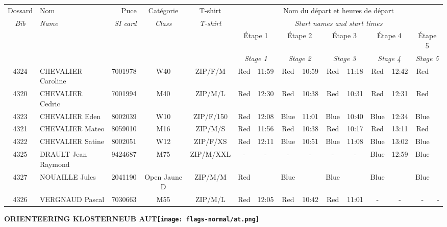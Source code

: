 \documentclass{report}
\begin{document}
  \begin{longtable}{|c|l|r|c|c|*{5}{cc|}}
    Dossard & Nom  & Puce    & Catégorie & T-shirt & \multicolumn{10}{c|}{Nom du départ et heures de départ} \\
    \itshape Bib     & \itshape Name & \itshape SI card & \itshape Class  & \itshape  T-shirt  & \multicolumn{10}{c|}{\itshape Start names and start times} \\
    \hline
    & & & & & \multicolumn{2}{c|}{Étape 1} & \multicolumn{2}{c|}{Étape 2} & \multicolumn{2}{c|}{Étape 3} & \multicolumn{2}{c|}{Étape 4} & \multicolumn{2}{c|}{Étape 5} \\
    & & & & & \multicolumn{2}{c|}{\itshape Stage 1} & \multicolumn{2}{c|}{\itshape Stage 2} & \multicolumn{2}{c|}{\itshape Stage 3} & \multicolumn{2}{c|}{\itshape Stage 4} & \multicolumn{2}{c|}{\itshape Stage 5} \\
    \hline
    4324 & CHEVALIER Caroline & 7001978 & W40 & ZIP/F/M & Red & 11:59 & Red & 10:59 & Red & 11:18 & Red & 12:42 & Red &  \\
    4320 & CHEVALIER Cedric & 7001994 & M40 & ZIP/M/L & Red & 12:30 & Red & 10:38 & Red & 10:31 & Red & 12:31 & Red &  \\
    4323 & CHEVALIER Eden & 8002039 & W10 & ZIP/F/150 & Red & 12:08 & Blue & 11:01 & Blue & 10:40 & Blue & 12:34 & Blue &  \\
    4321 & CHEVALIER Mateo & 8059010 & M16 & ZIP/M/S & Red & 11:56 & Red & 10:38 & Red & 10:17 & Red & 13:11 & Red &  \\
    4322 & CHEVALIER Satine & 8002051 & W12 & ZIP/F/XS & Red & 12:11 & Blue & 10:51 & Blue & 11:08 & Blue & 13:02 & Blue &  \\
    4325 & DRAULT Jean Raymond & 9424687 & M75 & ZIP/M/XXL & - &  - & - &  - & - &  - & Blue & 12:59 & Blue &  \\
    4327 & NOUAILLE Jules & 2041190 & Open Jaune D & ZIP/M/M & Red &   & Blue &   & Blue &   & Blue &   & Blue &  \\
    4326 & VERGNAUD Pascal & 7030663 & M55 & ZIP/M/L & Red & 12:05 & Red & 10:42 & Red & 11:01 & - &  - & - &  -\\
  \end{longtable}
\newpage
  \Huge \centering \bfseries ORIENTEERING KLOSTERNEUB  AUT\normalfont \footnotesize \sffamily \hfill \texttt{[image: flags-normal/at.png]} \newline 
\end{document}
